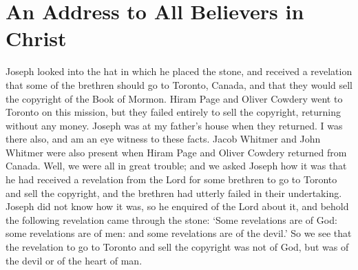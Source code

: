 \chapter{An Address to All Believers in Christ}
\label{chap:believers}

Joseph looked into the hat in which he placed the stone, and received a 
revelation that some of the brethren should go to Toronto, Canada, and that 
they would sell the copyright of the Book of Mormon. Hiram Page and Oliver 
Cowdery went to Toronto on this mission, but they failed entirely to sell the 
copyright, returning without any money. Joseph was at my father's house when 
they returned. I was there also, and am an eye witness to these facts. Jacob 
Whitmer and John Whitmer were also present when Hiram Page and Oliver Cowdery 
returned from Canada. Well, we were all in great trouble; and we asked Joseph 
how it was that he had received a revelation from the Lord for some brethren to 
go to Toronto and sell the copyright, and the brethren had utterly failed in 
their undertaking. Joseph did not know how it was, so he enquired of the Lord 
about it, and behold the following revelation came through the stone: 
`Some revelations are of God: some revelations are of men: and some 
revelations are of the devil.' So we see that the revelation to go to 
Toronto and sell the copyright was not of God, but was of the devil 
or of the heart of man.

\cite{whitmer}
